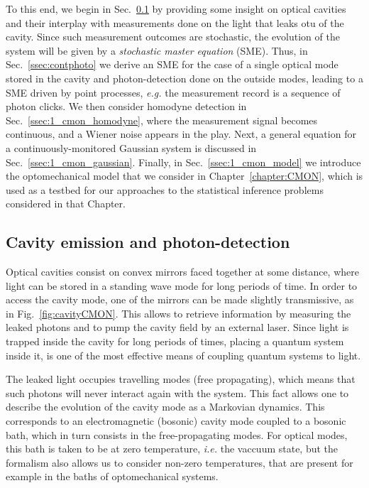 To this end, we begin in Sec.~\ref{ssec:1_cmon_physics} by providing some insight on optical cavities and their interplay with measurements done on the light that leaks otu of the cavity. Since such measurement outcomes are stochastic, the evolution of the system will be given by a \textit{stochastic master equation} (SME). Thus, in Sec.~\ref{ssec:contphoto} we derive an SME for the case of a single optical mode stored in the cavity and photon-detection done on the outside modes, leading to a SME driven by point processes, \textit{e.g.} the measurement record is a sequence of photon clicks. We then consider homodyne detection in Sec.~\ref{ssec:1_cmon_homodyne}, where the measurement signal becomes continuous, and a Wiener noise appears in the play. Next, a general equation for a continuously-monitored Gaussian system is discussed in Sec.~\ref{ssec:1_cmon_gaussian}.
Finally, in Sec.~\ref{ssec:1_cmon_model} we introduce the optomechanical model that we consider in Chapter~\ref{chapter:CMON}, which is used as a testbed for our approaches to the statistical inference problems considered in that Chapter.

\subsection{Cavity emission and photon-detection}\label{ssec:1_cmon_physics}
Optical cavities consist on convex mirrors faced together at some distance, where light can be stored in a standing wave mode for long periods of time. In order to access the cavity mode, one of the mirrors can be made slightly transmissive, as in Fig.~\ref{fig:cavityCMON}. This allows to retrieve information by measuring the leaked photons and to pump the cavity field by an external laser. Since light is trapped inside the cavity for long periods of times, placing a quantum system inside it, is one of the most effective means of coupling quantum systems to light.

The leaked light occupies travelling modes (free propagating), which means that such photons will never interact again with the system. This fact allows one to describe the evolution of the cavity mode as a Markovian dynamics. This corresponds to an electromagnetic (bosonic) cavity mode coupled to a bosonic bath, which in turn consists in the free-propagating modes. For optical modes, this bath is taken to be at zero temperature, \textit{i.e.} the vaccuum state, but the formalism also allows us to consider non-zero temperatures, that are present for example in the baths of optomechanical systems.

